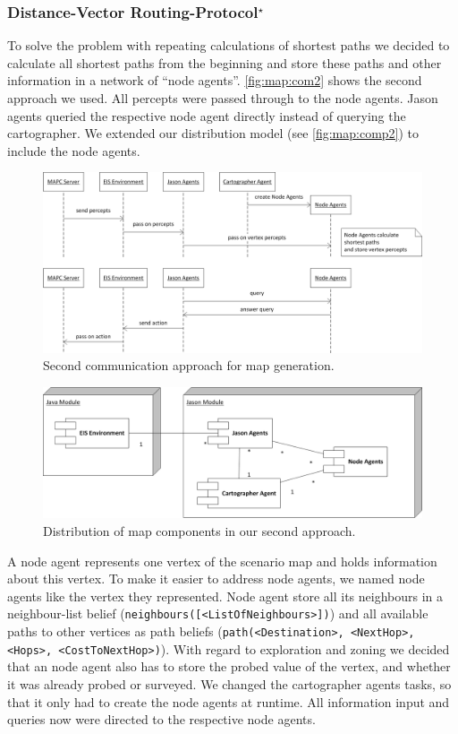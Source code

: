 \subsubsection[Distance-Vector Routing Protocol]{Distance-Vector Routing-Protocol$^\star$}\label{alg:map_dv}
To solve the problem with repeating calculations of shortest paths we decided to calculate all shortest paths from the beginning and store these paths and other information in a network of ``node agents''.
\autoref{fig:map:com2} shows the second approach we used.
All percepts were passed through to the node agents.
Jason agents queried the respective node agent directly instead of querying the cartographer.
We extended our distribution model (see \autoref{fig:map:comp2}) to include the node agents.
\begin{figure}
  \centering
  \includegraphics[width=\linewidth]{images/map_com_2.png}
  \caption{Second communication approach for map generation.}
  \label{fig:map:com2}
\end{figure}

\begin{figure}
  \centering
  \includegraphics[width=\linewidth]{images/map_comp_2.png}
  \caption{Distribution of map components in our second approach.}
  \label{fig:map:comp2}
\end{figure}

A node agent represents one vertex of the scenario map and holds information about this vertex.
To make it easier to address node agents, we named node agents like the vertex they represented.
Node agent store all its neighbours in a neighbour-list belief (\texttt{neighbours([<ListOfNeighbours>])}) and all available paths to other vertices as path beliefs (\texttt{path(<Destination>, <NextHop>, <Hops>, <CostToNextHop>)}).
With regard to exploration and zoning we decided that an node agent also has to store the probed value of the vertex, and whether it was already probed or surveyed.
We changed the cartographer agents tasks, so that it only had to create the node agents at runtime.
All information input and queries now were directed to the respective node agents.

